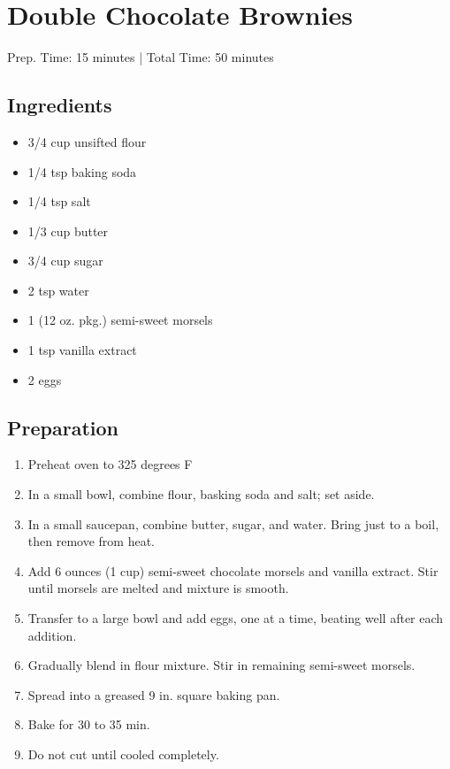 \section{Double Chocolate Brownies}

\begin{center}
Prep. Time: 15 minutes |
Total Time: 50 minutes
\end{center}

\subsection{Ingredients}
\begin{multicols}{2}
\begin{itemize}
    \item 3/4 cup unsifted flour
    \item 1/4 tsp baking soda
    \item 1/4 tsp salt
    \item 1/3 cup butter
    \item 3/4 cup sugar
    \item 2 tsp water
    \item 1 (12 oz. pkg.) semi-sweet morsels
    \item 1 tsp vanilla extract
    \item 2 eggs
\end{itemize}
\end{multicols}

\subsection{Preparation}
\begin{enumerate}
    \item Preheat oven to 325 degrees F
    \item In a small bowl, combine flour, basking soda and salt; set aside.
    \item In a small saucepan, combine butter, sugar, and water. Bring just to a boil, then remove from heat.
    \item Add 6 ounces (1 cup) semi-sweet chocolate morsels and vanilla extract. Stir until morsels are melted and mixture is smooth.
    \item Transfer to a large bowl and add eggs, one at a time, beating well after each addition.
    \item Gradually blend in flour mixture. Stir in remaining semi-sweet morsels.
    \item Spread into a greased 9 in. square baking pan.
    \item Bake for 30  to 35 min.
    \item Do not cut until cooled completely.
\end{enumerate}

